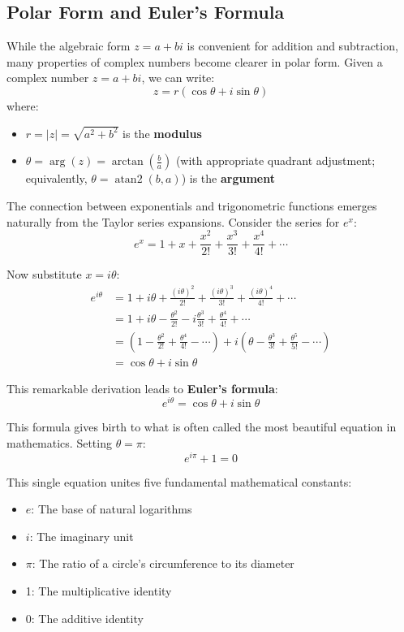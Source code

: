 \subsection*{Polar Form and Euler's Formula} 

\noindent While the algebraic form $z = a + bi$ is convenient for addition and subtraction, many properties of complex numbers become clearer in polar form. Given a complex number $z = a + bi$, we can write:
\[
z = r(\cos\theta + i\sin\theta)
\]
where:
\begin{itemize}
   \item $r = |z| = \sqrt{a^2 + b^2}$ is the \textbf{modulus}
   \item $\theta = \arg(z) = \arctan(\frac{b}{a})$ (with appropriate quadrant adjustment; equivalently, $\theta = \operatorname{atan2}(b, a)$) is the \textbf{argument}
\end{itemize}

\noindent The connection between exponentials and trigonometric functions emerges naturally from the Taylor series expansions. Consider the series for $e^x$:
\[
e^x = 1 + x + \frac{x^2}{2!} + \frac{x^3}{3!} + \frac{x^4}{4!} + \cdots
\]

\noindent Now substitute $x = i\theta$:
\begin{align*}
e^{i\theta} &= 1 + i\theta + \frac{(i\theta)^2}{2!} + \frac{(i\theta)^3}{3!} + \frac{(i\theta)^4}{4!} + \cdots \\
&= 1 + i\theta - \frac{\theta^2}{2!} - i\frac{\theta^3}{3!} + \frac{\theta^4}{4!} + \cdots \\
&= (1 - \frac{\theta^2}{2!} + \frac{\theta^4}{4!} - \cdots) + i(\theta - \frac{\theta^3}{3!} + \frac{\theta^5}{5!} - \cdots) \\
&= \cos\theta + i\sin\theta
\end{align*}

\noindent This remarkable derivation leads to \textbf{Euler's formula}:
\[
e^{i\theta} = \cos\theta + i\sin\theta
\]

\noindent This formula gives birth to what is often called the most beautiful equation in mathematics. Setting $\theta = \pi$:
\[
e^{i\pi} + 1 = 0
\]

\noindent This single equation unites five fundamental mathematical constants:
\begin{itemize}
   \item $e$: The base of natural logarithms
   \item $i$: The imaginary unit
   \item $\pi$: The ratio of a circle's circumference to its diameter
   \item 1: The multiplicative identity
   \item 0: The additive identity
\end{itemize}

